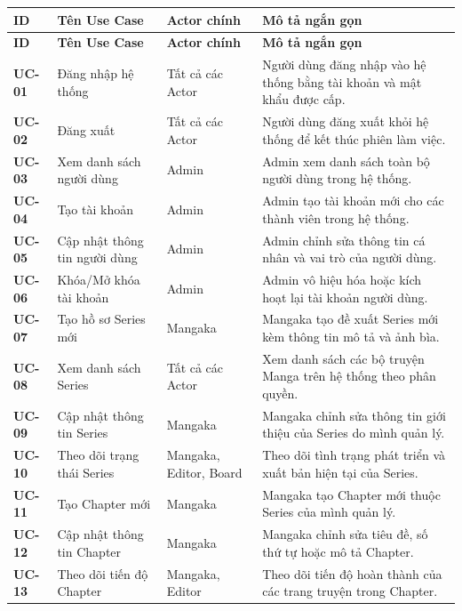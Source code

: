 \begin{longtable}{|p{1.3cm}|p{4.2cm}|p{3.2cm}|p{6.0cm}|}
    \hline
    \rowcolor{tableheader}
    \textbf{ID} & \textbf{Tên Use Case} & \textbf{Actor chính} & \textbf{Mô tả ngắn gọn} \rule[-1.2ex]{0pt}{4ex} \\ \hline
    \endfirsthead
    \hline
    \rowcolor{tableheader}
    \textbf{ID} & \textbf{Tên Use Case} & \textbf{Actor chính} & \textbf{Mô tả ngắn gọn} \rule[-1.2ex]{0pt}{4ex} \\ \hline
    \endhead
    \textbf{UC-01} & Đăng nhập hệ thống & Tất cả các Actor & Người dùng đăng nhập vào hệ thống bằng tài khoản và mật khẩu được cấp. \\ \hline
    \textbf{UC-02} & Đăng xuất & Tất cả các Actor & Người dùng đăng xuất khỏi hệ thống để kết thúc phiên làm việc. \\ \hline
    \textbf{UC-03} & Xem danh sách người dùng & Admin & Admin xem danh sách toàn bộ người dùng trong hệ thống. \\ \hline
    \textbf{UC-04} & Tạo tài khoản & Admin & Admin tạo tài khoản mới cho các thành viên trong hệ thống. \\ \hline
    \textbf{UC-05} & Cập nhật thông tin người dùng & Admin & Admin chỉnh sửa thông tin cá nhân và vai trò của người dùng. \\ \hline
    \textbf{UC-06} & Khóa/Mở khóa tài khoản & Admin & Admin vô hiệu hóa hoặc kích hoạt lại tài khoản người dùng. \\ \hline
    \textbf{UC-07} & Tạo hồ sơ Series mới & Mangaka & Mangaka tạo đề xuất Series mới kèm thông tin mô tả và ảnh bìa. \\ \hline
    \textbf{UC-08} & Xem danh sách Series & Tất cả các Actor & Xem danh sách các bộ truyện Manga trên hệ thống theo phân quyền. \\ \hline
    \textbf{UC-09} & Cập nhật thông tin Series & Mangaka & Mangaka chỉnh sửa thông tin giới thiệu của Series do mình quản lý. \\ \hline
    \textbf{UC-10} & Theo dõi trạng thái Series & Mangaka, Editor, Board & Theo dõi tình trạng phát triển và xuất bản hiện tại của Series. \\ \hline
    \textbf{UC-11} & Tạo Chapter mới & Mangaka & Mangaka tạo Chapter mới thuộc Series của mình quản lý. \\ \hline
    \textbf{UC-12} & Cập nhật thông tin Chapter & Mangaka & Mangaka chỉnh sửa tiêu đề, số thứ tự hoặc mô tả Chapter. \\ \hline
    \textbf{UC-13} & Theo dõi tiến độ Chapter & Mangaka, Editor & Theo dõi tiến độ hoàn thành của các trang truyện trong Chapter. \\ \hline

\end{longtable}
